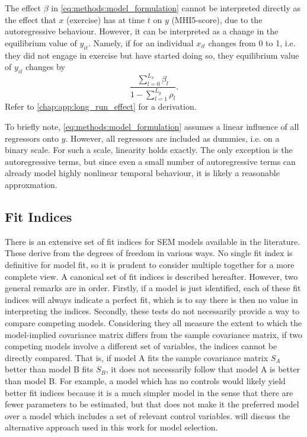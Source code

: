 The effect $\beta$ in \cref{eq:methods:model_formulation} cannot be interpreted directly as the effect that $x$ (exercise)
has at time $t$ on $y$ (MHI5-score), due to the autoregressive behaviour. However, it can be interpreted as a change
in the equilibrium value of $y_{it}$. Namely, if for an individual $x_{it}$ changes from 0 to 1, i.e. they did not
engage in exercise but have started doing so, they equilibrium value of $y_{it}$ changes by
\begin{equation}
    \frac{\sum_{l=0}^{L_x} \beta_l}{1 - \sum_{l=1}^{L_y} \rho_l}.
\end{equation}
Refer to \cref{chap:app:long_run_effect} for a derivation.

To briefly note, \cref{eq:methods:model_formulation} assumes a linear influence of all regressors onto $y$. However, all regressors
are included as dummies, i.e. on a binary scale. For such a scale, linearity holds exactly.
The only exception is the autoregressive terms, but since even a small number of autoregressive terms can already
model highly nonlinear temporal behaviour, it is likely a reasonable approxmation.

\subsection{Fit Indices}
\label{sec:methods:fit_indices}
There is an extensive set of fit indices for SEM models available in the literature. These derive from the degrees of freedom
in various ways. No single fit index is definitive for model fit, so it is prudent to consider multiple together
for a more complete view. A canonical set of fit indices is described hereafter. However, two general remarks are in order.
Firstly, if a model is just identified, each of these fit indices will always indicate a perfect fit, which is to
say there is then no value in interpreting the indices.
Secondly, these tests do not necessarily provide a way to compare competing models. Considering they all measure the
extent to which the model-implied covariance matrix differs from the sample covariance matrix, if two competing models
involve a different set of variables, the indices cannot be directly compared. That is, if model A fits the sample
covariance matrix $S_A$ better than model B fits $S_B$, it does not necessarily follow that model A is better than model B.
For example, a model which has no controls would likely yield better fit indices because it is a much simpler model
in the sense that there are fewer parameters to be estimated,
but that does not make it the preferred model over a model which includes a set of relevant control variables.
 will discuss the alternative approach used in this work for model selection.

